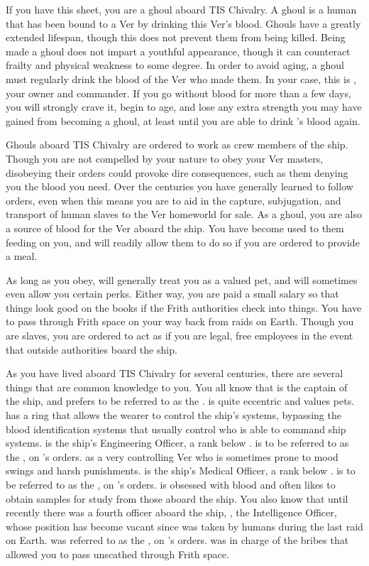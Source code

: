 \documentclass[blue]{guildcamp4}
\begin{document}
\name{\bGhouls{}}

If you have this sheet, you are a ghoul aboard TIS Chivalry. A ghoul is a human that has been bound to a Ver by drinking this Ver's blood. Ghouls have a greatly extended lifespan, though this does not prevent them from being killed. Being made a ghoul does not impart a youthful appearance, though it can counteract frailty and physical weakness to some degree. In order to avoid aging, a ghoul must regularly drink the blood of the Ver who made them. In your case, this is \cVone{}, your owner and commander. If you go without \cVone{\their} blood for more than a few days, you will strongly crave it, begin to age, and lose any extra strength you may have gained from becoming a ghoul, at least until you are able to drink \cVone{}'s blood again.

Ghouls aboard TIS Chivalry are ordered to work as crew members of the ship. Though you are not compelled by your nature to obey your Ver masters, disobeying their orders could provoke dire consequences, such as them denying you the blood you need. Over the centuries you have generally learned to follow orders, even when this means you are to aid in the capture, subjugation, and transport of human slaves to the Ver homeworld for sale. As a ghoul, you are also a source of blood for the Ver aboard the ship. You have become used to them feeding on you, and will readily allow them to do so if you are ordered to provide a meal.

As long as you obey, \cVone{} will generally treat you as a valued pet, and will sometimes even allow you certain perks. Either way, you are paid a small salary so that things look good on the books if the Frith authorities check into things. You have to pass through Frith space on your way back from raids on Earth. Though you are slaves, you are ordered to act as if you are legal, free employees in the event that outside authorities board the ship.

As you have lived aboard TIS Chivalry for several centuries, there are several things that are common knowledge to you. You all know that \cVone{} is the captain of the ship, and prefers to be referred to as the \cVone{\Duke}. \cVone{} is quite eccentric and values \cVone{\their} pets. \cVone{} has a ring that allows the wearer to control the ship's systems, bypassing the blood identification systems that usually control who is able to command ship systems. \cVtwo{} is the ship's Engineering Officer, a rank below \cVone{}. \cVtwo{} is to be referred to as the \cVtwo{\Marq}, on \cVone{}'s orders. \cVtwo{} as a very controlling Ver who is sometimes prone to mood swings and harsh punishments. \cVthree{} is the ship's Medical Officer, a rank below \cVtwo{}. \cVthree{} is to be referred to as the \cVthree{\Baron}, on \cVone{}'s orders. \cVthree{} is obsessed with blood and often likes to obtain samples for study from those aboard the ship. You also know that until recently there was a fourth officer aboard the ship, \cIntel{}, the Intelligence Officer, whose position has become vacant since \cIntel{\they} was taken by humans during the last raid on Earth. \cIntel{} was referred to as the \cIntel{\Count}, on \cVone{}'s orders. \cIntel{} was in charge of the bribes that allowed you to pass unscathed through Frith space.
\end{document}
